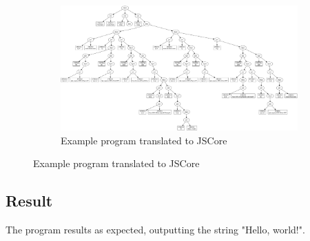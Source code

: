 \begin{figure}
\begin{figure}[H]
\includegraphics[width=\textwidth]{../interpreter/tests/helloworld/helloworld.png}
\caption{Example program translated to JSCore}
\label{helloworldgraph}
\end{figure}
\end{figure}




\subsection{Result}

The program results as expected, outputting the string "Hello, world!".

